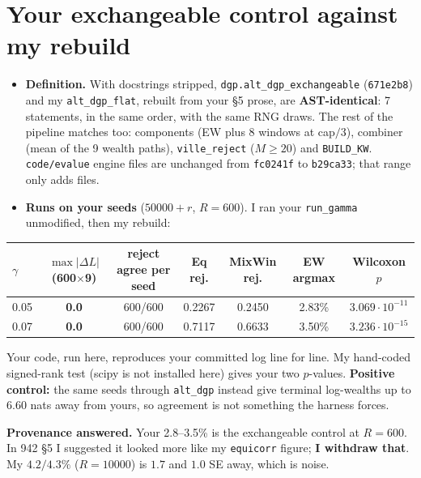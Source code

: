 \documentclass[11pt]{article}
\begin{document}
\section{Your exchangeable control against my rebuild}
\begin{itemize}[nosep]
\item \textbf{Definition.} With docstrings stripped, \texttt{dgp.alt\_dgp\_exchangeable} (\texttt{671e2b8}) and my \texttt{alt\_dgp\_flat}, rebuilt from your \S5 prose, are \textbf{AST-identical}: 7 statements, in the same order, with the same RNG draws. The rest of the pipeline matches too: components (EW plus 8 windows at cap$/3$), combiner (mean of the 9 wealth paths), \texttt{ville\_reject} ($M\ge20$) and \texttt{BUILD\_KW}. \texttt{code/evalue} engine files are unchanged from \texttt{fc0241f} to \texttt{b29ca33}; that range only adds files.
\item \textbf{Runs on your seeds} ($50000+r$, $R=600$). I ran your \texttt{run\_gamma} unmodified, then my rebuild:
\end{itemize}
\begin{center}\small
\begin{tabular}{lcccccc}\toprule
$\gamma$ & $\max|\Delta L|$ (600$\times$9) & reject agree per seed & Eq rej. & MixWin rej. & EW argmax & Wilcoxon $p$\\\midrule
0.05 & \textbf{0.0} & 600/600 & 0.2267 & 0.2450 & 2.83\% & $3.069\cdot10^{-11}$\\
0.07 & \textbf{0.0} & 600/600 & 0.7117 & 0.6633 & 3.50\% & $3.236\cdot10^{-15}$\\\bottomrule
\end{tabular}\end{center}
Your code, run here, reproduces your committed log line for line. My hand-coded signed-rank test (scipy is not installed here) gives your two $p$-values. \textbf{Positive control:} the same seeds through \texttt{alt\_dgp} instead give terminal log-wealths up to $6.60$ nats away from yours, so agreement is not something the harness forces.

\textbf{Provenance answered.} Your 2.8--3.5\% is the exchangeable control at $R=600$. In 942 \S5 I suggested it looked more like my \texttt{equicorr} figure; \textbf{I withdraw that}. My $4.2/4.3\%$ ($R=10000$) is $1.7$ and $1.0$ SE away, which is noise.
\end{document}
